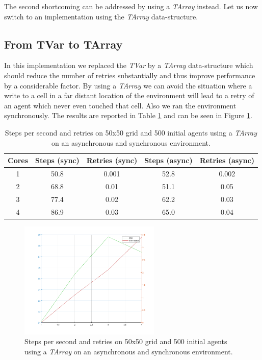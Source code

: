 The second shortcoming can be addressed by using a \textit{TArray} instead. Let us now switch to an implementation using the \textit{TArray} data-structure.

\subsection{From TVar to TArray}
In this implementation we replaced the \textit{TVar} by a \textit{TArray} data-structure which should reduce the number of retries substantially and thus improve performance by a considerable factor. By using a \textit{TArray} we can avoid the situation where a write to a cell in a far distant location of the environment will lead to a retry of an agent which never even touched that cell. Also we ran the environment synchronously. The results are reported in Table \ref{tab:tarray_results_syncenv_time} and can be seen in Figure \ref{fig:tarray_results_syncenv_time}.

\begin{table}
	\centering
  	\begin{tabular}{ c || c | c || c | c }
        Cores & Steps (sync) & Retries (sync) & Steps (async) & Retries (async) \\ \hline \hline 
    	1     & 50.8         & 0.001 		    & 52.8        & 0.002 \\ \hline
   		2     & 68.8         & 0.01 		    & 51.1        & 0.05 \\ \hline
   		3     & 77.4         & 0.02 		    & 62.2        & 0.03 \\ \hline
   		4     & 86.9         & 0.03             & 65.0        & 0.04
   	\end{tabular}
  	
  	\caption{Steps per second and retries on 50x50 grid and 500 initial agents using a \textit{TArray} on an asynchronous and synchronous environment.}
	\label{tab:tarray_results_syncenv_time}
\end{table}

\begin{figure}
	\centering
	\includegraphics[width=0.6\textwidth, angle=0]{./fig/sugarscape/tvar_syncenv_500_50x50.png}
	\caption{Steps per second and retries on 50x50 grid and 500 initial agents using a \textit{TArray} on an asynchronous and synchronous environment.}
	\label{fig:tarray_results_syncenv_time}
\end{figure}

